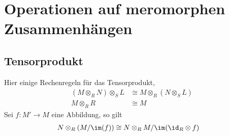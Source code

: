 \chapter{Operationen auf meromorphen Zusammenhängen}
\section{Tensorprodukt}
\begin{comment}
\begin{defn}[Tensorprodukt]
\cite[3(Algebra).11.21]{stacks-project}
\begin{center}
\begin{tikzpicture} [scale=3.3, descr/.style={fill=white,inner sep=2.5pt} ]
  \matrix (m) [
    matrix of math nodes
    , row sep=2em
    , column sep=3em
  ]{
    M\times N & M\otimes_RN \\
              & T \\
  };
  \path[->,font=\scriptsize,>=angle 90]
  (m-1-1) edge node[above]{$  $} (m-1-2)
  (m-1-1) edge node[below]{$f$} (m-2-2)
  ;
  \path[->,font=\scriptsize,>=angle 90,dashed]
  (m-1-2) edge node[right]{$\exists!\gamma$} (m-2-2)
  ;
\end{tikzpicture}
\end{center}
Für eine Abbildung $f:M\rightarrow M'$ definiere das Tensorprodukt davon über
$R$ mit $N$ als
\[
\id_N \otimes f:
\begin{array}[t]{ccc}
N\otimes_{R}M & \rightarrow & N\otimes_{R}M'\\
n\otimes m & \mapsto & n\otimes f(m)
\end{array}
\]
\end{defn}
\end{comment}
\begin{bem} \label{bem:Rechenregeln-Tensorprodukt}
Hier einige Rechenregeln für das Tensorprodukt,
\begin{align}
(M\otimes_R N)\otimes_S L &\cong M\otimes_R (N \otimes_S L)
  \label{bem:Rechenregeln-Tensorprodukt1}\\
M\otimes_R R &\cong M \label{bem:Rechenregeln-Tensorprodukt2}
\end{align}
Sei $f:M'\rightarrow M$ eine Abbildung, so gilt
\begin{align}
N\otimes_R(M/\im(f)) &\cong N\otimes_R M / \im(\id_{R}\otimes f)
\label{bem:Rechenregeln-Tensorprodukt3}
\end{align}
\end{bem}

